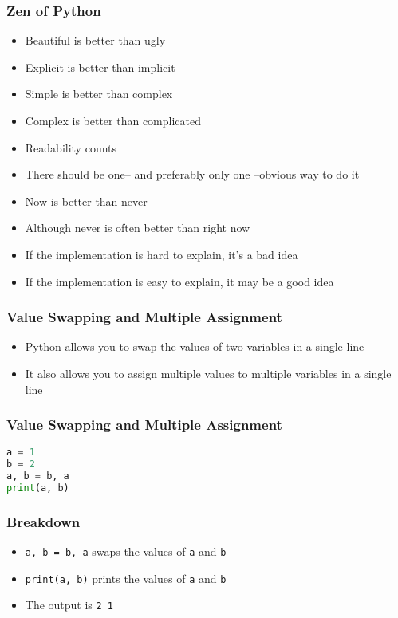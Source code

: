 \documentclass[serif, 9pt, aspectratio=32]{beamer}
\begin{document}
\begin{frame}
    \centering
    \frametitle{Zen of Python}
    \begin{itemize}
        \setlength{\itemsep}{2em}
        \item Beautiful is better than ugly
        \item Explicit is better than implicit
        \item Simple is better than complex
        \item Complex is better than complicated
        \item Readability counts
        \item There should be one-- and preferably only one --obvious way to do it
        \item Now is better than never
        \item Although never is often better than right now
        \item If the implementation is hard to explain, it's a bad idea
        \item If the implementation is easy to explain, it may be a good idea
    \end{itemize}
\end{frame}

\begin{frame}
    \centering
    \frametitle{Value Swapping and Multiple Assignment}
    \begin{itemize}
        \setlength{\itemsep}{2em}
        \item Python allows you to swap the values of two variables in a single line
        \item It also allows you to assign multiple values to multiple variables in a single line
    \end{itemize}
\end{frame}

\begin{frame}[fragile]
    \frametitle{Value Swapping and Multiple Assignment}
    \begin{lstlisting}[language=Python]
a = 1
b = 2
a, b = b, a
print(a, b)
    \end{lstlisting}
\end{frame}

\begin{frame}
    \centering
    \frametitle{Breakdown}
    \begin{itemize}
        \setlength{\itemsep}{2em}
        \item \texttt{a, b = b, a} swaps the values of \texttt{a} and \texttt{b}
        \item \texttt{print(a, b)} prints the values of \texttt{a} and \texttt{b}
        \item The output is \texttt{2 1}
    \end{itemize}
\end{frame}
\end{document}
